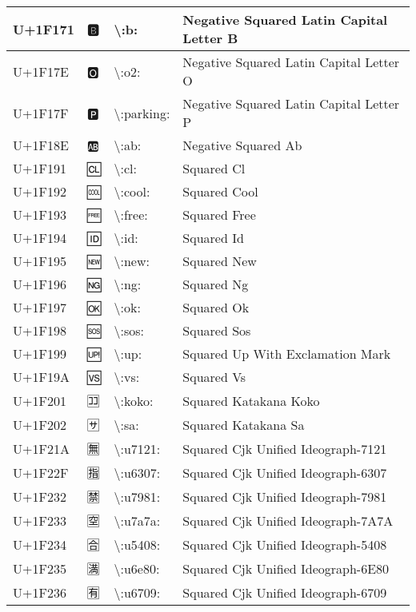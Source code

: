 \begin{table}[h]
\begin{tabulary}{\linewidth}{|L|L|L|L|}
\hline
U+1F171 & 🅱 & {\textbackslash}:b: & Negative Squared Latin Capital Letter B \\
\hline
U+1F17E & 🅾 & {\textbackslash}:o2: & Negative Squared Latin Capital Letter O \\
\hline
U+1F17F & 🅿 & {\textbackslash}:parking: & Negative Squared Latin Capital Letter P \\
\hline
U+1F18E & 🆎 & {\textbackslash}:ab: & Negative Squared Ab \\
\hline
U+1F191 & 🆑 & {\textbackslash}:cl: & Squared Cl \\
\hline
U+1F192 & 🆒 & {\textbackslash}:cool: & Squared Cool \\
\hline
U+1F193 & 🆓 & {\textbackslash}:free: & Squared Free \\
\hline
U+1F194 & 🆔 & {\textbackslash}:id: & Squared Id \\
\hline
U+1F195 & 🆕 & {\textbackslash}:new: & Squared New \\
\hline
U+1F196 & 🆖 & {\textbackslash}:ng: & Squared Ng \\
\hline
U+1F197 & 🆗 & {\textbackslash}:ok: & Squared Ok \\
\hline
U+1F198 & 🆘 & {\textbackslash}:sos: & Squared Sos \\
\hline
U+1F199 & 🆙 & {\textbackslash}:up: & Squared Up With Exclamation Mark \\
\hline
U+1F19A & 🆚 & {\textbackslash}:vs: & Squared Vs \\
\hline
U+1F201 & 🈁 & {\textbackslash}:koko: & Squared Katakana Koko \\
\hline
U+1F202 & 🈂 & {\textbackslash}:sa: & Squared Katakana Sa \\
\hline
U+1F21A & 🈚 & {\textbackslash}:u7121: & Squared Cjk Unified Ideograph-7121 \\
\hline
U+1F22F & 🈯 & {\textbackslash}:u6307: & Squared Cjk Unified Ideograph-6307 \\
\hline
U+1F232 & 🈲 & {\textbackslash}:u7981: & Squared Cjk Unified Ideograph-7981 \\
\hline
U+1F233 & 🈳 & {\textbackslash}:u7a7a: & Squared Cjk Unified Ideograph-7A7A \\
\hline
U+1F234 & 🈴 & {\textbackslash}:u5408: & Squared Cjk Unified Ideograph-5408 \\
\hline
U+1F235 & 🈵 & {\textbackslash}:u6e80: & Squared Cjk Unified Ideograph-6E80 \\
\hline
U+1F236 & 🈶 & {\textbackslash}:u6709: & Squared Cjk Unified Ideograph-6709 \\
\hline

\end{tabulary}
\end{table}
